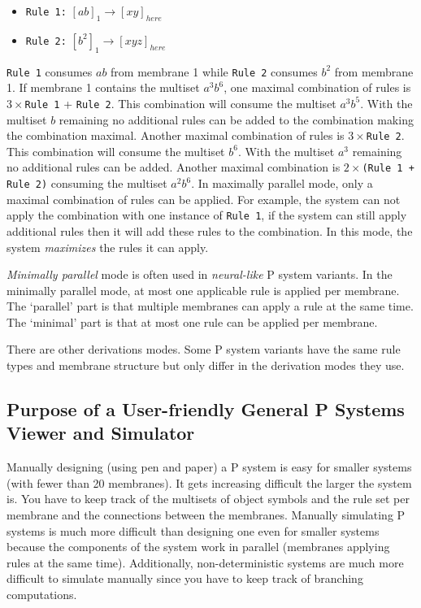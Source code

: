 \documentclass{article}
\begin{document}
\begin{itemize}
\item \texttt{Rule 1:} $[ab]_1 \rightarrow [xy]_{here}$
\item \texttt{Rule 2:} $[b^2]_1 \rightarrow [xyz]_{here}$ 
\end{itemize}

\texttt{Rule 1} consumes $ab$ from membrane 1 while \texttt{Rule 2} consumes $b^2$
from membrane 1. If membrane 1 contains the multiset $a^3b^6$, one maximal combination of rules is
$3 \times$\texttt{Rule 1} + \texttt{Rule 2}. This combination will consume the multiset $a^3b^5$.
With the multiset $b$ remaining no additional rules can be added to the combination making the
combination maximal. Another maximal combination of rules is $3\times$\texttt{Rule 2}. This
combination will consume the multiset $b^6$. With the multiset $a^3$ remaining no additional rules
can be added. Another maximal combination is $2\times$\texttt{(Rule 1 + Rule 2)} consuming the
multiset $a^2b^6$. In maximally parallel mode, only a maximal combination of rules can be applied.
For example, the system can not apply the combination with one instance of \texttt{Rule 1}, if the
system can still apply additional rules then it will add these rules to the combination. In this
mode, the system \textit{maximizes} the rules it can apply.

\textit{Minimally parallel} mode is often used in \textit{neural-like} P system variants. In the
minimally parallel mode, at most one applicable rule is applied per membrane. The `parallel' part is
that multiple membranes can apply a rule at the same time. The `minimal' part is that at most one
rule can be applied per membrane.

There are other derivations modes. Some P system variants have the same rule types and membrane
structure but only differ in the derivation modes they use.

 
\subsection{Purpose of a User-friendly General P Systems Viewer and Simulator}\label{s-purpose}

Manually designing (using pen and paper) a P system is easy for smaller systems (with fewer than 20
membranes). It gets increasing difficult the larger the system is. You have to keep track of the
multisets of object symbols and the rule set per membrane and the connections between the membranes.
Manually simulating P systems is much more difficult than designing one even for smaller systems 
because the components of the system work in parallel (membranes applying rules at the same time). 
Additionally, non-deterministic systems are much more difficult to simulate manually since you have
to keep track of branching computations.
\end{document}
